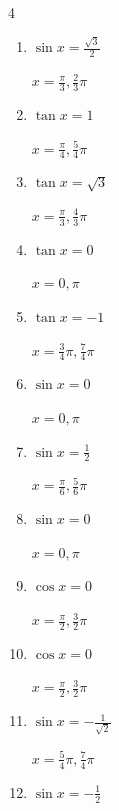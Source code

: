 \begin{multicols}{4}
\begin{enumerate}
        $\displaystyle x = \frac{\pi}{6} , \frac{5}{6}\pi$

  \item $\displaystyle \sin{x}  = \frac{\sqrt{3}}{2}$

        $\displaystyle x = \frac{\pi}{3} , \frac{2}{3}\pi$

  \item $\displaystyle \tan{x}  = 1$

        $\displaystyle x = \frac{\pi}{4} , \frac{5}{4}\pi$

  \item $\displaystyle \tan{x}  = \sqrt{3}$

        $\displaystyle x = \frac{\pi}{3} , \frac{4}{3}\pi$

  \item $\displaystyle \tan{x}  = 0$

        $\displaystyle x = 0 , \pi$

  \item $\displaystyle \tan{x}  = -1$

        $\displaystyle x = \frac{3}{4}\pi , \frac{7}{4}\pi$

  \item $\displaystyle \sin{x}  = 0$

        $\displaystyle x = 0 , \pi$

  \item $\displaystyle \sin{x}  = \frac{1}{2}$

        $\displaystyle x = \frac{\pi}{6} , \frac{5}{6}\pi$

  \item $\displaystyle \sin{x}  = 0$

        $\displaystyle x = 0 , \pi$

  \item $\displaystyle \cos{x}  = 0$

        $\displaystyle x = \frac{\pi}{2} , \frac{3}{2}\pi$

  \item $\displaystyle \cos{x}  = 0$

        $\displaystyle x = \frac{\pi}{2} , \frac{3}{2}\pi$

  \item $\displaystyle \sin{x}  = -\frac{1}{\sqrt{2}}$

        $\displaystyle x = \frac{5}{4}\pi , \frac{7}{4}\pi$

\columnbreak %

\resetques

  \item $\displaystyle \sin{x}  = -\frac{1}{2}$


\end{enumerate}
\end{multicols}
